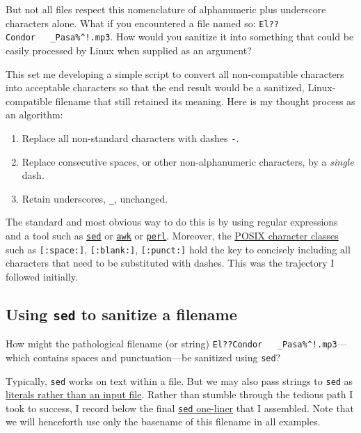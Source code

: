 \documentclass[
  a4paper,
]{article}
\providecommand{\tightlist}{%
  \setlength{\itemsep}{0pt}\setlength{\parskip}{0pt}}
\begin{document}
But not all files respect this nomenclature of alphanumeric plus
underscore characters alone. What if you encountered a file named so:
\texttt{El??Condor\ \ \ \_Pasa\%\^{}!.mp3}. How would you sanitize it
into something that could be easily processed by Linux when supplied as
an argument?

This set me developing a simple script to convert all non-compatible
characters into acceptable characters so that the end result would be a
sanitized, Linux-compatible filename that still retained its meaning.
Here is my thought process as an algorithm:

\begin{enumerate}
\tightlist
\item
  Replace all non-standard characters with dashes \texttt{-}.
\item
  Replace consecutive spaces, or other non-alphanumeric characters, by a
  \emph{single} dash.
\item
  Retain underscores, \texttt{\_}, unchanged.
\end{enumerate}

The standard and most obvious way to do this is by using regular
expressions and a tool such as
\href{https://www.grymoire.com/Unix/Sed.html}{\texttt{sed}} or
\href{https://tldp.org/LDP/abs/html/awk.html}{\texttt{awk}} or
\href{https://perldoc.perl.org/perlretut}{\texttt{perl}}. Moreover, the
\href{https://www.regular-expressions.info/posixbrackets.html}{POSIX
character classes} such as \texttt{{[}:space:{]}},
\texttt{{[}:blank:{]}}, \texttt{{[}:punct:{]}} hold the key to concisely
including all characters that need to be substituted with dashes. This
was the trajectory I followed initially.

\hypertarget{using-sed-to-sanitize-a-filename}{%
\subsection{\texorpdfstring{Using \texttt{sed} to sanitize a
filename}{Using sed to sanitize a filename}}\label{using-sed-to-sanitize-a-filename}}

How might the pathological filename (or string)
\texttt{El??Condor\ \ \ \_Pasa\%\^{}!.mp3}---which contains spaces and
punctuation---be sanitized using \texttt{sed}?

Typically, \texttt{sed} works on text within a file. But we may also
pass strings to \texttt{sed} as
\href{https://www.baeldung.com/linux/sed-with-string}{literals rather
than an input file}. Rather than stumble through the tedious path I took
to success, I record below the final
\href{https://catonmat.net/sed-one-liners-explained-part-one}{\texttt{sed}
one-liner} that I assembled. Note that we will henceforth use only the
basename of this filename in all examples.
\end{document}

